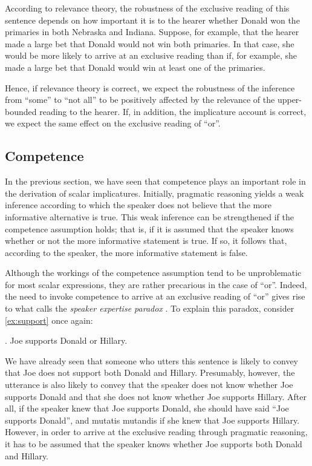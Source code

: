 \documentclass[12pt]{article}
\begin{document}
According to relevance theory, the robustness of the exclusive reading of this sentence depends on how important it is to the hearer whether Donald won the primaries in both Nebraska and Indiana. Suppose, for example, that the hearer made a large bet that Donald would not win both primaries. In that case, she would be more likely to arrive at an exclusive reading than if, for example, she made a large bet that Donald would win at least one of the primaries.

Hence, if relevance theory is correct, we expect the robustness of the inference from ``some'' to ``not all'' to be positively affected by the relevance of the upper-bounded reading to the hearer. If, in addition, the implicature account is correct, we expect the same effect on the exclusive reading of ``or''.

\subsection*{Competence}

In the previous section, we have seen that competence plays an important role in the derivation of scalar implicatures. Initially, pragmatic reasoning yields a weak inference according to which the speaker does not believe that the more informative alternative is true. This weak inference can be strengthened if the competence assumption holds; that is, if it is assumed that the speaker knows whether or not the more informative statement is true. If so, it follows that, according to the speaker, the more informative statement is false.

Although the workings of the competence assumption tend to be unproblematic for most scalar expressions, they are rather precarious in the case of ``or''. Indeed, the need to invoke competence to arrive at an exclusive reading of ``or'' gives rise to what \citet{zondervan2010} calls the \emph{speaker expertise paradox} \citep[cf.][]{geurts2006}. To explain this paradox, consider \ref{ex:support} once again:

\ex.	Joe supports Donald or Hillary.

We have already seen that someone who utters this sentence is likely to convey that Joe does not support
both Donald and Hillary. Presumably, however, the utterance is also likely to convey that the speaker does not know whether
Joe supports Donald and that she does not know whether Joe supports Hillary. After all, if the speaker knew that Joe supports Donald, she should have said ``Joe supports Donald'', and mutatis mutandis if she knew that Joe supports Hillary. However, in order to arrive at the exclusive reading through pragmatic reasoning, it has to be assumed that the
speaker knows whether Joe supports both Donald and Hillary. 
\end{document}
